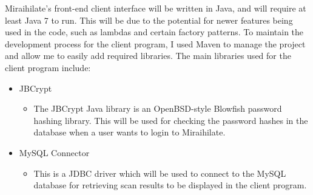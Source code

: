 Miraihilate's front-end client interface will be written in Java, and will require at least Java 7 to run. This will be due to the potential for newer features being used in the code, such as lambdas and certain factory patterns. To maintain the development process for the client program, I used Maven to manage the project and allow me to easily add required libraries. The main libraries used for the client program include:

\begin{itemize}
	\item{JBCrypt}
	\begin{itemize}
		\item{The JBCrypt Java library is an OpenBSD-style Blowfish password hashing library. This will be used for checking the password hashes in the database when a user wants to login to Miraihilate.}
	\end{itemize}
	\item{MySQL Connector}
	\begin{itemize}
		\item{This is a JDBC driver which will be used to connect to the MySQL database for retrieving scan results to be displayed in the client program.}
	\end{itemize}
\end{itemize}
